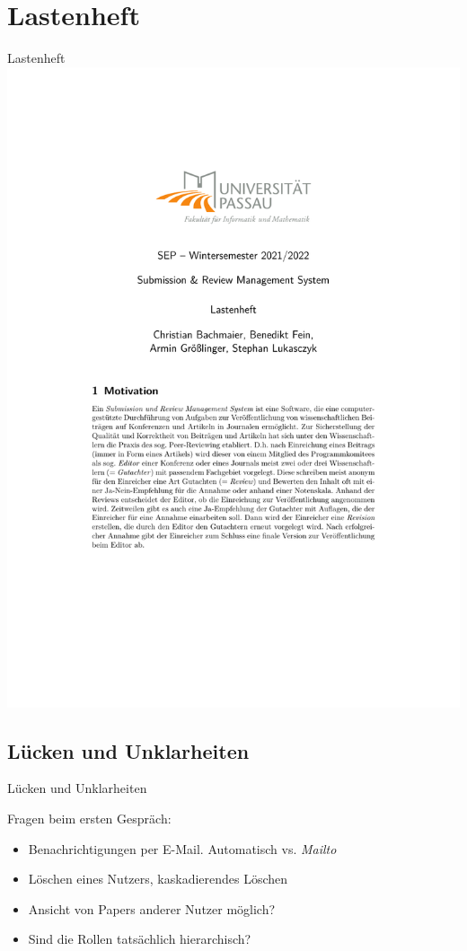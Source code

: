 \documentclass{beamer}
\begin{document}
\section{Lastenheft}
\begin{frame}{Lastenheft}
	\centering
	\includegraphics[height=1.1\textheight]{../../docs/Lastenheft/lastenheft}
\end{frame}


\subsection{Lücken und Unklarheiten}
\begin{frame}{Lücken und Unklarheiten}

	Fragen beim ersten Gespräch:
	\pause

	\begin{itemize}
		\item Benachrichtigungen per E-Mail. Automatisch vs. \emph{Mailto}
		\pause
		\item Löschen eines Nutzers, kaskadierendes Löschen
		\pause
		\item Ansicht von Papers anderer Nutzer möglich?
		\pause
		\item Sind die Rollen tatsächlich hierarchisch?
	\end{itemize}

\end{frame}
\end{document}
